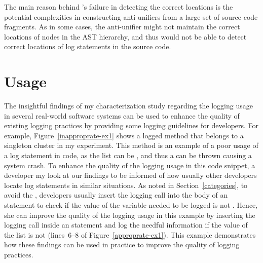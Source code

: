 The main reason behind 's failure in detecting the correct locations is the potential complexities in constructing anti-unifiers from a large set of source code fragments. As in some cases, the anti-unifier might not maintain the correct locations of nodes in the AST hierarchy, and thus  would not be able to detect correct locations of log statements in the source code.





\section{Usage}  \label{usageELUS}
The insightful findings of my characterization study regarding the logging usage in several real-world software systems can be used to enhance the quality of existing logging practices by providing some logging guidelines for developers. For example, Figure~\ref{inapproprate-ex1} shows a logged method that belongs to a singleton cluster in my experiment. This  method is an example of a poor usage of a log statement in code, as the list  can be , and thus a  can be thrown causing a system crash. To enhance the quality of the logging usage in this code snippet, a developer my look at our findings to be informed of how usually other developers locate log statements in similar situations. As noted in Section~\ref{categories}, to avoid the , developers usually insert the logging call into the body of an  statement to check if the value of the variable needed to be logged is not . Hence, she can improve the quality of the logging usage in this example by inserting the logging call inside an  statement and log the needful information if the value of the list  is not  (lines~6--8 of Figure~\ref{approprate-ex1}). This example demonstrates how these findings can be used in practice to improve the quality of logging practices.


